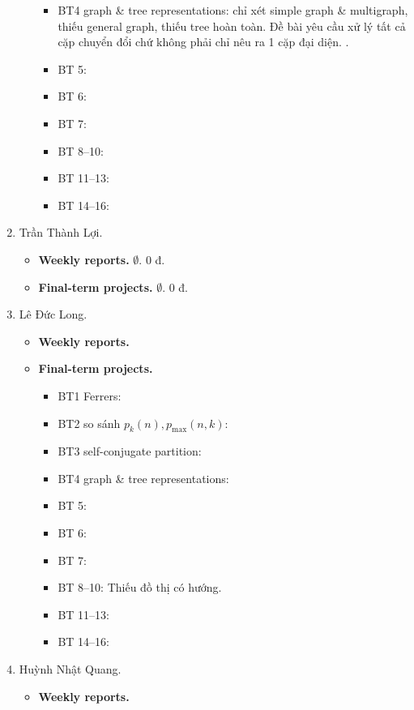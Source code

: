\documentclass{article}
\begin{document}
\begin{enumerate}
\begin{itemize}
\begin{itemize}
            \item BT4 graph \& tree representations: chỉ xét simple graph \& multigraph, thiếu general graph, thiếu tree hoàn toàn. Đề bài yêu cầu xử lý tất cả cặp chuyển đổi chứ không phải chỉ nêu ra 1 cặp đại diện. .
            \item BT 5:
            \item BT 6:
            \item BT 7:
            \item BT 8--10:
            \item BT 11--13:
            \item BT 14--16:
        \end{itemize}
    \end{itemize}
    \item {\sc Trần Thành Lợi.}
    \begin{itemize}
        \item {\bf Weekly reports.} $\emptyset$. 0 đ.
        \item {\bf Final-term projects.} $\emptyset$. 0 đ.
    \end{itemize}
    \item {\sc Lê Đức Long.}
    \begin{itemize}
        \item {\bf Weekly reports.}
        \item {\bf Final-term projects.}
        \begin{itemize}
            \item BT1 Ferrers:
            \item BT2 so sánh $p_k(n),p_{\max}(n,k)$:
            \item BT3 self-conjugate partition:
            \item BT4 graph \& tree representations:
            \item BT 5:
            \item BT 6:
            \item BT 7:
            \item BT 8--10: Thiếu đồ thị có hướng.
            \item BT 11--13:
            \item BT 14--16:
        \end{itemize}
    \end{itemize}
    \item {\sc Huỳnh Nhật Quang.}
    \begin{itemize}
        \item {\bf Weekly reports.}

\end{itemize}
\end{enumerate}
\end{document}
